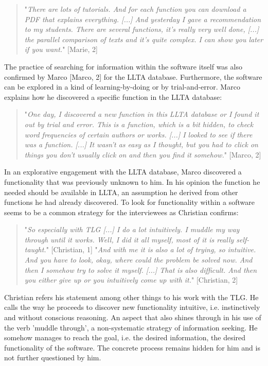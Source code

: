 \documentclass[12pt, a4paper, titlepage, oneside, abstract=true, toc=listof, toc=bibliography]{scrreprt}
\begin{document}
{\begin{quotation}
"\textit{There are lots of tutorials. And for each function you can download a PDF that explains everything. [...] And yesterday I gave a recommendation to my students. There are several functions, it's really very well done, [...] the parallel comparison of texts and it's quite complex. I can show you later if you want.}" [Marie, 2]
\end{quotation}

The practice of searching for information within the software itself was also confirmed by Marco [Marco, 2] for the \gls{LLTA} database.
Furthermore, the software can be explored in a kind of learning-by-doing or by trial-and-error. Marco explains how he discovered a specific function in the LLTA database:

\begin{quotation}
"\textit{One day, I discovered a new function in this LLTA database or I found it out by trial and error. This is a function, which is a bit hidden, to check word frequencies of certain authors or works. [...] I looked to see if there was a function. [...] It wasn't as easy as I thought, but you had to click on things you don't usually click on and then you find it somehow.}" [Marco, 2]
\end{quotation}

In an explorative engagement with the LLTA database, Marco discovered a functionality that was previously unknown to him. In his opinion the function he needed should be available in LLTA, an assumption he derived from other functions he had already discovered. To look for functionality within a software seems to be a common strategy for the interviewees as Christian confirms:

\begin{quotation}
"\textit{So especially with TLG [...] I do a lot intuitively. I muddle my way through until it works. Well, I did it all myself, most of it is really self-taught.}" [Christian, 1]
"\textit{And with me it is also a lot of trying, so intuitive. And you have to look, okay, where could the problem be solved now. And then I somehow try to solve it myself. [...] That is also difficult. And then you either give up or you intuitively come up with it.}" [Christian, 2]
\end{quotation}

Christian refers his statement among other things to his work with the TLG. He calls the way he proceeds to discover new functionality intuitive, i.e. instinctively and without conscious reasoning. An aspect that also shines through in his use of the verb 'muddle through', a non-systematic strategy of information seeking. He somehow manages to reach the goal, i.e. the desired information, the desired functionality of the software. The concrete process remains hidden for him and is not further questioned by him.

}
\end{document}
